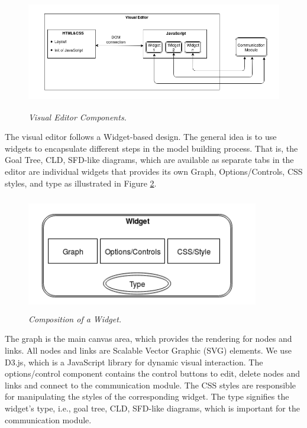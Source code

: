 \documentclass[a4paper]{article}
\begin{document}
\begin{figure}
\begin{center}
\includegraphics[height=2in,width=5in]{img/visual.png}
\caption{\small \sl Visual Editor Components.\label{fig:visual}}
\end{center}
\end{figure}

The visual editor follows a Widget-based design. The general idea is to use widgets to encapsulate different steps in the model building process. That is, the Goal Tree, CLD, SFD-like diagrams, which are available as separate tabs in the editor are individual widgets that provides its own Graph, Options/Controls, CSS styles, and type as illustrated in Figure \ref{fig:widget}.

\begin{figure}
\begin{center}
\includegraphics[height=2in,width=4in]{img/widget.png}
\caption{\small \sl Composition of a Widget.\label{fig:widget}}
\end{center}
\end{figure}

The graph is the main canvas area, which provides the rendering for nodes and links. All nodes and links are Scalable Vector Graphic (SVG) elements. We use D3.js, which is a JavaScript library for dynamic visual interaction. The options/control component contains the control buttons to edit, delete nodes and links and connect to the communication module. The CSS styles are responsible for manipulating the styles of the corresponding widget. The type signifies the widget’s type, i.e., goal tree, CLD, SFD-like diagrams, which is important for the communication module.
\end{document}
